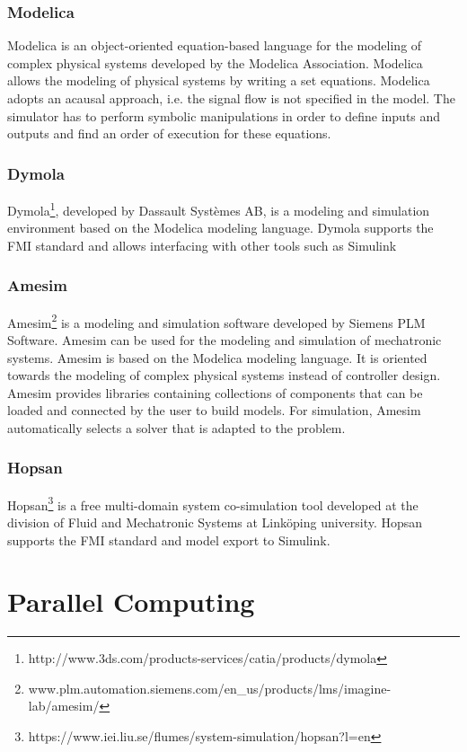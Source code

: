 \subsubsection{Modelica}

Modelica is an object-oriented equation-based language for the modeling of complex physical systems developed by the Modelica Association. Modelica allows the modeling of physical systems by writing a set equations. Modelica adopts an acausal approach, i.e. the signal flow is not specified in the model. The simulator has to perform symbolic manipulations in order to define inputs and outputs and find an order of execution for these equations.

\subsubsection{Dymola}

Dymola\footnote{http://www.3ds.com/products-services/catia/products/dymola}, developed by Dassault Syst\`emes AB, is a modeling and simulation environment based on the Modelica modeling language. Dymola supports the FMI standard and allows interfacing with other tools such as Simulink

\subsubsection{Amesim}
Amesim\footnote{www.plm.automation.siemens.com/en\_us/products/lms/imagine-lab/amesim/} is a modeling and simulation software developed by Siemens PLM Software. Amesim can be used for the modeling and simulation of mechatronic systems. Amesim is based on the Modelica modeling language. It is oriented towards the modeling of complex physical systems instead of controller design. Amesim provides libraries containing collections of components that can be loaded and connected by the user to build models. For simulation, Amesim automatically selects a solver that is adapted to the problem.

\subsubsection{Hopsan}
Hopsan\footnote{https://www.iei.liu.se/flumes/system-simulation/hopsan?l=en} is a free multi-domain system co-simulation tool developed at the division of Fluid and Mechatronic Systems at Link\"oping university. Hopsan supports the FMI standard and model export to Simulink.
\section{Parallel Computing}

